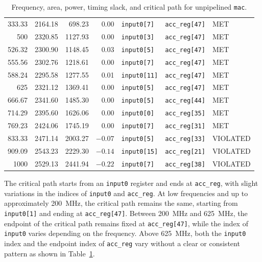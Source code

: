 \documentclass[a4paper,11pt]{article}
\begin{document}
\begin{table}[H]
\begin{tabular}{rrrrlll}
        333.33  & 2164.18 & 698.23  & 0.00   & \texttt{input0[7]}  & \texttt{acc\_reg[47]} & MET \\
        500     & 2320.85 & 1127.93 & 0.00   & \texttt{input0[3]}  & \texttt{acc\_reg[47]} & MET \\
        526.32  & 2300.90 & 1148.45 & 0.03   & \texttt{input0[5]}  & \texttt{acc\_reg[47]} & MET \\
        555.56  & 2302.76 & 1218.61 & 0.00   & \texttt{input0[7]}  & \texttt{acc\_reg[47]} & MET \\
        588.24  & 2295.58 & 1277.55 & 0.01   & \texttt{input0[11]} & \texttt{acc\_reg[47]} & MET \\
        625     & 2321.12 & 1369.41 & 0.00   & \texttt{input0[5]}  & \texttt{acc\_reg[47]} & MET \\
        666.67  & 2341.60 & 1485.30 & 0.00   & \texttt{input0[5]}  & \texttt{acc\_reg[44]} & MET \\
        714.29  & 2395.60 & 1626.06 & 0.00   & \texttt{input0[0]}  & \texttt{acc\_reg[35]} & MET \\
        769.23  & 2424.06 & 1745.19 & 0.00   & \texttt{input0[7]}  & \texttt{acc\_reg[31]} & MET \\
        833.33  & 2471.14 & 2003.27 & $-0.07$ & \texttt{input0[5]}  & \texttt{acc\_reg[33]} & VIOLATED \\
        909.09  & 2543.23 & 2229.30 & $-0.14$ & \texttt{input0[15]} & \texttt{acc\_reg[21]} & VIOLATED \\
        1000    & 2529.13 & 2441.94 & $-0.22$ & \texttt{input0[7]}  & \texttt{acc\_reg[38]} & VIOLATED \\
        \bottomrule
    \end{tabular}
    \caption{Frequency, area, power, timing slack, and critical path for unpipelined \texttt{mac}.}
    \label{tab:frequency-area-slack-path}
\end{table}

The critical path starts from an \texttt{input0} register and ends at \texttt{acc\_reg}, with slight variations in the indices of \texttt{input0} and \texttt{acc\_reg}. At low frequencies and up to approximately 200~MHz, the critical path remains the same, starting from \texttt{input0[1]} and ending at \texttt{acc\_reg[47]}. Between 200~MHz and 625~MHz, the endpoint of the critical path remains fixed at \texttt{acc\_reg[47]}, while the index of \texttt{input0} varies depending on the frequency. Above 625~MHz, both the \texttt{input0} index and the endpoint index of \texttt{acc\_reg} vary without a clear or consistent pattern as shown in Table~\ref{tab:frequency-area-slack-path}.
\end{document}
